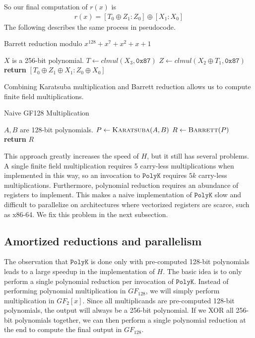 \documentclass[hctr2.tex]{subfiles}
\begin{document}
So our final computation of $r(x)$ is
\begin{align*}
       r(x) = [T_0 \oplus Z_1 : Z_0] \oplus [X_1 : X_0]
\end{align*}
The following describes the same process in pseudocode.
\begin{algorithm}[H]
	\caption{Barrett reduction modulo $x^{128} + x^7 + x^2 + x + 1$}\label{barrett}
\begin{algorithmic}[1]
	\Require $X$ is a 256-bit polynomial.
	 
		\State $T \gets clmul(X_3, \texttt{0x87})$
		\State $Z \gets clmul(X_2 \oplus T_1, \texttt{0x87})$ 
		\State \textbf{return} $[T_0 \oplus Z_1 \oplus X_1 : Z_0 \oplus X_0]$
	\EndProcedure
\end{algorithmic}
\end{algorithm}
Combining Karatsuba multiplication and Barrett reduction allows us to compute finite field multiplications.
\begin{algorithm}[H]
	\caption{Naive GF128 Multiplication}\label{GF128Naive}
\begin{algorithmic}[1]
	\Require $A, B$ are 128-bit polynomials.
		\State $P \gets \Call{Karatsuba}{A, B}$
		\State $R \gets \Call{Barrett}{P}$
		\State \textbf{return} $R$
	\EndProcedure
\end{algorithmic}
\end{algorithm}
This approach greatly increases the speed of $H$, but it still has several problems. A single finite field multiplication requires 5 carry-less multiplications when implemented in this way, so an invocation to $\texttt{PolyK}$ requires $5k$ carry-less multiplications. Furthermore, polynomial reduction requires an abundance of registers to implement. This makes a naive implementation of $\texttt{PolyK}$ slow and difficult to parallelize on architectures where vectorized registers are scarce, such as x86-64. We fix this problem in the next subsection.

\subsection{Amortized reductions and parallelism}
The observation that $\texttt{PolyK}$ is done only with pre-computed 128-bit polynomials leads to a large speedup in the implementation of $H$. The basic idea is to only perform a single polynomial reduction per invocation of $\texttt{PolyK}$. Instead of performing polynomial multiplication in $GF_{128}$, we will simply perform multiplication in $GF_{2}[x]$. Since all multiplicands are pre-computed 128-bit polynomials, the output will always be a 256-bit polynomial. If we XOR all 256-bit polynomials together, we can then perform a single polynomial reduction at the end to compute the final output in $GF_{128}$.
\end{document}

